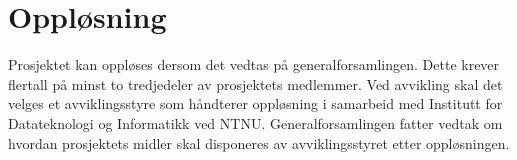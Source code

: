 \section{Oppløsning}\label{sec:oppløsning}
Prosjektet kan oppløses dersom det vedtas på generalforsamlingen.
Dette krever flertall på minst to tredjedeler av prosjektets medlemmer.
Ved avvikling skal det velges et avviklingsstyre som håndterer oppløsning i samarbeid med Institutt for Datateknologi og Informatikk ved NTNU.\@
Generalforsamlingen fatter vedtak om hvordan prosjektets midler skal disponeres av avviklingsstyret etter oppløsningen. 